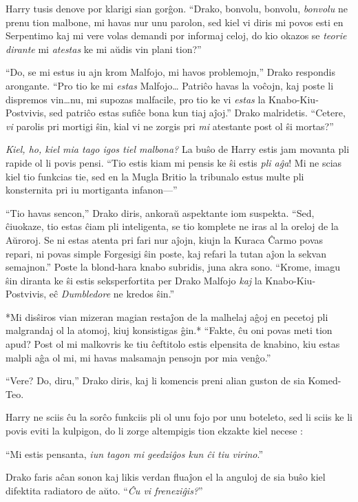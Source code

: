 Harry tusis denove por klarigi sian gorĝon. ``Drako, bonvolu, bonvolu,
\emph{bonvolu} ne prenu tion malbone, mi havas nur unu parolon, sed
kiel vi diris mi povos esti en Serpentimo kaj mi vere volas demandi
por informaj celoj, do kio okazos se \emph{teorie dirante} mi
\emph{atestas} ke mi aŭdis vin plani tion?''

``Do, se mi estus iu ajn krom Malfojo, mi havos problemojn,'' Drako
respondis arongante. ``Pro tio ke mi \emph{estas} Malfojo\ldots
Patriĉo havas la voĉojn, kaj poste li dispremos vin\ldots nu, mi
supozas malfacile, pro tio ke vi \emph{estas} la Knabo-Kiu-Postvivis,
sed patriĉo estas sufiĉe bona kun tiaj aĵoj.'' Drako
malridetis. ``Cetere, \emph{vi} parolis pri mortigi ŝin, kial vi ne
zorgis pri \emph{mi} atestante post ol ŝi mortas?''

\emph{Kiel, ho, kiel mia tago igos tiel malbona?} La buŝo de Harry
estis jam movanta pli rapide ol li povis pensi. ``Tio estis kiam mi
pensis ke ŝi estis \emph{pli aĝa}! Mi ne scias kiel tio funkcias tie,
sed en la Mugla Britio la tribunalo estus multe pli konsternita pri iu
mortiganta infanon—''

``Tio havas sencon,'' Drako diris, ankoraŭ aspektante iom
suspekta. ``Sed, ĉiuokaze, tio estas ĉiam pli inteligenta, se tio
komplete ne iras al la oreloj de la Aŭroroj. Se ni estas atenta pri
fari nur aĵojn, kiujn la Kuraca Ĉarmo povas repari, ni povas simple
Forgesigi ŝin poste, kaj refari la tutan aĵon la sekvan semajnon.''
Poste la blond-hara knabo subridis, juna akra sono. ``Krome, imagu
ŝin diranta ke ŝi estis seksperfortita per Drako Malfojo \emph{kaj} la
Knabo-Kiu-Postvivis, eĉ \emph{Dumbledore} ne kredos ŝin.''


*Mi disŝiros vian mizeran magian restaĵon de la malhelaj aĝoj en
pecetoj pli malgrandaj ol la atomoj, kiuj konsistigas ĝin.* ``Fakte,
ĉu oni povas meti tion apud? Post ol mi malkovris ke tiu ĉeftitolo
estis elpensita de knabino, kiu estas malpli aĝa ol mi, mi havas
malsamajn pensojn por mia venĝo.''

``Vere? Do, diru,'' Drako diris, kaj li komencis preni alian guston de
sia Komed-Teo.

Harry ne sciis ĉu la sorĉo funkciis pli ol unu fojo por unu boteleto,
sed li sciis ke li povis eviti la kulpigon, do li zorge altempigis
tion ekzakte kiel necese :

``Mi estis pensanta, \emph{iun tagon mi geedziĝos kun ĉi tiu
  virino}.''

Drako faris aĉan sonon kaj likis verdan fluaĵon el la anguloj de sia
buŝo kiel difektita radiatoro de aŭto. ``\emph{Ĉu vi freneziĝis?}''

